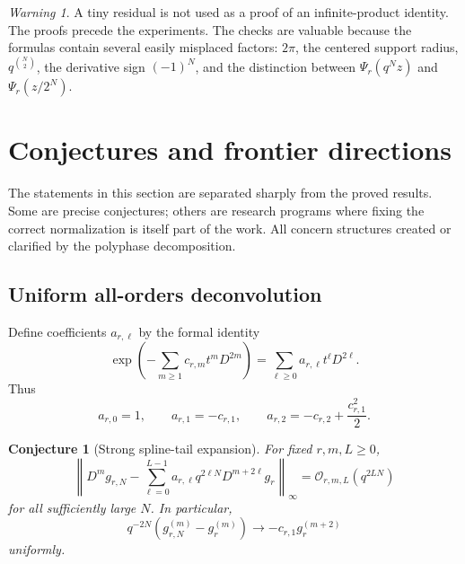 \documentclass[11pt,oneside]{article}
\numberwithin{equation}{section}
\newtheorem{conjecture}[theorem]{Conjecture}
\theoremstyle{definition}
\theoremstyle{remark}
\newtheorem{warning}[theorem]{Warning}
\newcommand{\bigO}{\mathcal O}
\begin{document}
\begin{warning}
A tiny residual is not used as a proof of an infinite-product identity.  The
proofs precede the experiments.  The checks are valuable because the formulas
contain several easily misplaced factors: $2\pi$, the centered support radius,
$q^{\binom N2}$, the derivative sign $(-1)^N$, and the distinction between
$\Psi_r(q^Nz)$ and $\Psi_r(z/2^N)$.
\end{warning}

\section{Conjectures and frontier directions}
\label{sec:frontiers}

The statements in this section are separated sharply from the proved results.
Some are precise conjectures; others are research programs where fixing the
correct normalization is itself part of the work.  All concern structures
created or clarified by the polyphase decomposition.

\subsection{Uniform all-orders deconvolution}

Define coefficients $a_{r,\ell}$ by the formal identity
\begin{equation}
 \exp\!\left(-\sum_{m\ge1}c_{r,m}t^mD^{2m}\right)
 =\sum_{\ell\ge0}a_{r,\ell}t^\ell D^{2\ell}.              \label{eq:ar-ell-def}
\end{equation}
Thus
\begin{equation}
 a_{r,0}=1,
 \qquad a_{r,1}=-c_{r,1},
 \qquad a_{r,2}=-c_{r,2}+\frac{c_{r,1}^2}{2}.             \label{eq:first-ar-ell}
\end{equation}

\begin{conjecture}[Strong spline-tail expansion]
\label{conj:strong-tail}
For fixed $r,m,L\ge0$,
\begin{equation}
 \left\|D^m g_{r,N}-
   \sum_{\ell=0}^{L-1}a_{r,\ell}q^{2\ell N}
      D^{m+2\ell}g_r\right\|_{\infty}
 =\bigO_{r,m,L}(q^{2LN})                                  \label{eq:strong-tail-conj}
\end{equation}
for all sufficiently large $N$.
In particular,
\begin{equation}
 q^{-2N}(g_{r,N}^{(m)}-g_r^{(m)})
 \longrightarrow-c_{r,1}g_r^{(m+2)}                       \label{eq:first-tail-limit}
\end{equation}
uniformly.
\end{conjecture}
\end{document}
